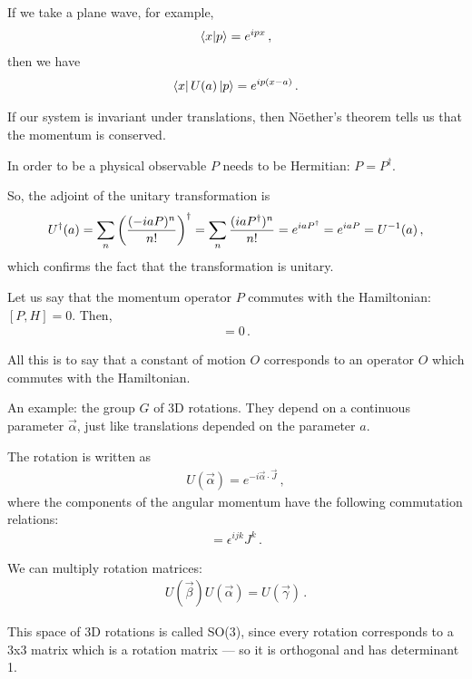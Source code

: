 \documentclass[main.tex]{subfiles}
\begin{document}
If we take a plane wave, for example,
%
\begin{align}
\braket{x}{p} = e^{i p x}
\,,
\end{align}
%
then we have 
%
\begin{align}
\bra{x} U(a) \ket{p} = e^{i p (x-a)}
\,.
\end{align}

If our system is invariant under translations, then Nöether's theorem tells us that the momentum is conserved. 

In order to be a physical observable \(P\) needs to be Hermitian: \(P = P ^\dag\). 

So, the adjoint of the unitary transformation is 
%
\begin{align}
U ^\dag (a) =
\sum _{n} \qty(\frac{(-iaP)^{n}}{n!}) ^\dag
= \sum _{n} \frac{(iaP ^\dag)^{n}}{n!}
=
e^{i a P ^\dag} = e^{iaP} = U^{-1}(a)
\,,
\end{align}
%
which confirms the fact that the transformation is unitary. 

Let us say that the momentum operator \(P\) commutes with the Hamiltonian: \([P,H] = 0\). Then, 
%
\begin{align}
[U(a), H] = 0 
\,.
\end{align}

All this is to say that a constant of motion \(O\) corresponds to an operator \(O\) which commutes with the Hamiltonian. 

An example: the group \(G\) of 3D rotations. 
They depend on a continuous parameter \(\vec{\alpha}\), just like translations depended on the parameter \(a\). 

The rotation is written as 
%
\begin{align}
U(\vec{\alpha}) = e^{-i \vec{\alpha} \cdot \vec{J}}
\,,
\end{align}
%
where the components of the angular momentum have the following commutation relations: 
%
\begin{align}
[J^{i}, J^{j}] = \epsilon^{ijk} J^{k}
\,.
\end{align}

We can multiply rotation matrices: 
%
\begin{align}
U(\vec{\beta}) U(\vec{\alpha}) = U(\vec{\gamma})
\,.
\end{align}

This space of 3D rotations is called SO(3), since every rotation corresponds to a 3x3 matrix which is a rotation matrix --- so it is orthogonal and has determinant 1.
\end{document}
